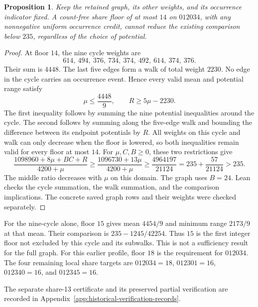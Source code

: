 \documentclass[11pt,a4paper]{article}
\newtheorem{proposition}[theorem]{Proposition}
\theoremstyle{definition}
\theoremstyle{remark}
\begin{document}
\begin{proposition}\label{prop:share-fourteen-obstruction}
Keep the retained graph, its other weights, and its occurrence indicator
fixed. A count-free share floor of at most $14$ on $012034$, with any
nonnegative uniform occurrence credit, cannot reduce the existing comparison
below $235$, regardless of the choice of potential.
\end{proposition}
\begin{proof}
At floor $14$, the nine cycle weights are
\[
614,\ 494,\ 376,\ 734,\ 374,\ 492,\ 614,\ 374,\ 376.
\]
Their sum is $4448$. The last five edges form a walk of total weight $2230$.
No edge in the cycle carries an occurrence event. Hence every valid
mean and potential range satisfy
\[
\mu\le\frac{4448}{9},\qquad R\ge5\mu-2230.
\]
The first inequality follows by summing the nine potential inequalities
around the cycle. The second follows by summing along the five-edge walk
and bounding the difference between its endpoint potentials by $R$.
All weights on this cycle and walk can only decrease when the floor is
lowered, so both inequalities remain valid for every floor at most $14$.
For $\mu,C,B\ge0$, these two restrictions give
\[
\frac{1098960+8\mu+BC+R}{4200+\mu}
\ge\frac{1096730+13\mu}{4200+\mu}
\ge\frac{4964197}{21124}
=235+\frac{57}{21124}>235.
\]
The middle ratio decreases with $\mu$ on this domain. The graph uses
$B=24$. Lean checks the cycle summation, the walk summation, and the
comparison implications. The concrete saved graph rows and their weights
were checked separately.
\end{proof}

For the nine-cycle alone, floor $15$ gives mean $4454/9$ and minimum
range $2173/9$ at that mean. Their comparison is
$235-1245/42254$. Thus $15$ is the first integer floor not excluded by this
cycle and its subwalks. This is not a sufficiency result for the full graph.
For this earlier profile, floor $18$ is the requirement for $012034$. The four remaining local share targets are
$012034=18$, $012301=16$, $012340=16$, and $012345=16$.

The separate share-13 certificate and its preserved partial verification
are recorded in Appendix~\ref{app:historical-verification-records}.
\end{document}
